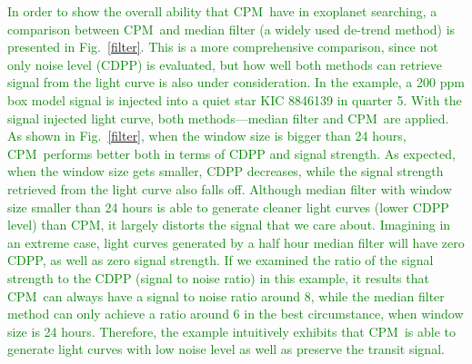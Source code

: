 \documentclass[12pt, preprint]{aastex}
\newcommand{\name}{CPM}
\newcommand{\revise}[1]{\textcolor{green}{#1}}
\begin{document}
\revise{In order to show the overall ability that \name\ have in exoplanet searching, a comparison between \name\ and median filter (a widely used de-trend method) is presented in Fig.~\ref{filter}. This is a more comprehensive comparison, since not only noise level (CDPP) is evaluated,  but how well both methods can retrieve signal from the light curve is also under consideration. In the example, a 200 ppm box model signal is injected into a quiet star KIC 8846139 in quarter 5. With the signal injected light curve,  both methods---median filter and \name\ are applied. As shown in Fig.~\ref{filter}, when  the window size is bigger than 24 hours, \name\ performs better both in terms of CDPP and signal strength. As expected, when the window size gets smaller, CDPP decreases,  while the signal strength retrieved from the light curve also falls off. Although median filter with window size smaller than 24 hours is able to generate cleaner light curves (lower CDPP level) than \name, it largely distorts the signal that we care about. Imagining in an extreme case, light curves generated by a half hour median filter will have zero CDPP, as well as zero signal strength. If we examined the ratio of the signal strength to the CDPP (signal to noise ratio) in this example, it results that \name\ can always have a signal to noise ratio around 8, while the median filter method can only achieve a ratio around 6 in the best circumstance, when window size is 24 hours. Therefore, the example intuitively exhibits that \name\ is able to generate light curves with low noise level as well as preserve the transit signal.}
\end{document}
